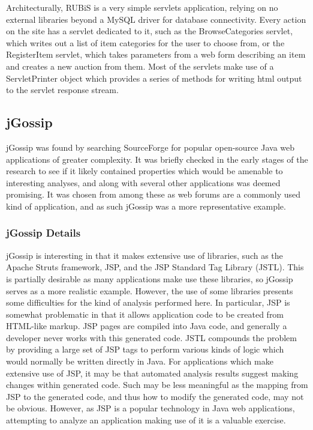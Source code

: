 \documentclass[msc,oneside]{ubcthesis}
\begin{document}
Architecturally, RUBiS is a very simple servlets application, relying on no external libraries beyond a MySQL driver for database connectivity. Every action on the site has a servlet dedicated to it, such as the BrowseCategories servlet, which writes out a list of item categories for the user to choose from, or the RegisterItem servlet, which takes parameters from a web form describing an item and creates a new auction from them. Most of the servlets make use of a ServletPrinter object which provides a series of methods for writing html output to the servlet response stream.

\subsection{jGossip}
jGossip was found by searching SourceForge for popular open-source Java web applications of greater complexity. It was briefly checked in the early stages of the research to see if it likely contained properties which would be amenable to interesting analyses, and along with several other applications was deemed promising. It was chosen from among these as web forums are a commonly used kind of application, and as such jGossip was a more representative example.

\subsubsection{jGossip Details}
jGossip is interesting in that it makes extensive use of libraries, such as the Apache Struts framework, JSP, and the JSP Standard Tag Library (JSTL). This is partially desirable as many applications make use these libraries, so jGossip serves as a more realistic example. However, the use of some libraries presents some difficulties for the kind of analysis performed here. In particular, JSP is somewhat problematic in that it allows application code to be created from HTML-like markup. JSP pages are compiled into Java code, and generally a developer never works with this generated code. JSTL compounds the problem by providing a large set of JSP tags to perform various kinds of logic which would normally be written directly in Java. For applications which make extensive use of JSP, it may be that automated analysis results suggest making changes within generated code. Such may be less meaningful as the mapping from JSP to the generated code, and thus how to modify the generated code, may not be obvious. However, as JSP is a popular technology in Java web applications, attempting to analyze an application making use of it is a valuable exercise.\\
\end{document}
